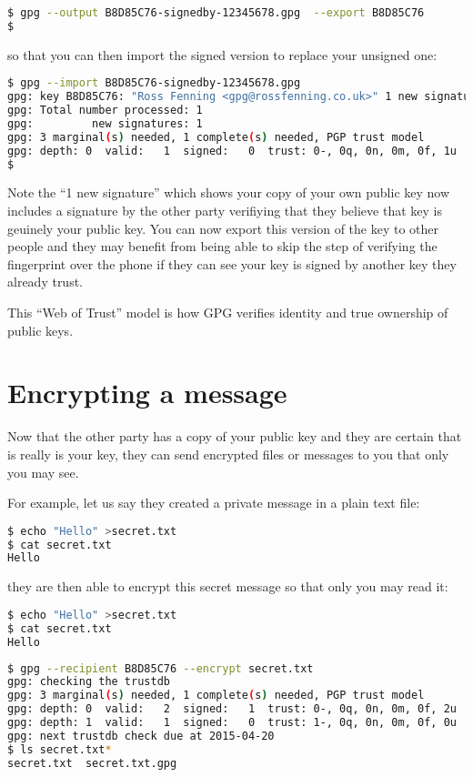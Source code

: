 \documentclass{report}
\begin{document}
\begin{lstlisting}[language=bash]
$ gpg --output B8D85C76-signedby-12345678.gpg  --export B8D85C76
$
\end{lstlisting}

\noindent so that you can then import the signed version to replace your
unsigned one:

\begin{lstlisting}[language=bash]
$ gpg --import B8D85C76-signedby-12345678.gpg
gpg: key B8D85C76: "Ross Fenning <gpg@rossfenning.co.uk>" 1 new signature
gpg: Total number processed: 1
gpg:         new signatures: 1
gpg: 3 marginal(s) needed, 1 complete(s) needed, PGP trust model
gpg: depth: 0  valid:   1  signed:   0  trust: 0-, 0q, 0n, 0m, 0f, 1u
$
\end{lstlisting}

Note the ``1 new signature'' which shows your copy of your own public key
now includes a signature by the other party verifiying that they
believe that key is geuinely your public key. You can now export this
version of the key to other people and they may benefit from being able
to skip the step of verifying the fingerprint over the phone if they
can see your key is signed by another key they already trust.

This ``Web of Trust'' model is how GPG verifies identity and true ownership
of public keys.

\section{Encrypting a message}

Now that the other party has a copy of your public key and they are certain
that is really is your key, they can send encrypted files or messages to
you that only you may see.

For example, let us say they created a private message in a plain text file:

\begin{lstlisting}[language=bash]
$ echo "Hello" >secret.txt
$ cat secret.txt 
Hello
\end{lstlisting}

\noindent they are then able to encrypt this secret message so that only you may read it:

\begin{lstlisting}[language=bash]
$ echo "Hello" >secret.txt
$ cat secret.txt 
Hello
\end{lstlisting}

\begin{lstlisting}[language=bash]
$ gpg --recipient B8D85C76 --encrypt secret.txt
gpg: checking the trustdb
gpg: 3 marginal(s) needed, 1 complete(s) needed, PGP trust model
gpg: depth: 0  valid:   2  signed:   1  trust: 0-, 0q, 0n, 0m, 0f, 2u
gpg: depth: 1  valid:   1  signed:   0  trust: 1-, 0q, 0n, 0m, 0f, 0u
gpg: next trustdb check due at 2015-04-20
$ ls secret.txt*
secret.txt  secret.txt.gpg
\end{lstlisting}
\end{document}
